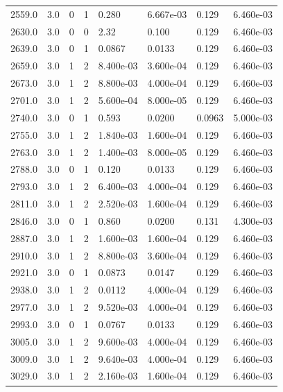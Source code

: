 \documentclass[preview]{standalone}
\begin{document}
{{{\begin{tabular}{L{1.2cm}C{1.2cm} C{0.3cm}C{0.5cm} C{1.4cm}C{1.4cm} C{1.4cm}C{1.4cm}}
  2559.0  &   3.0  & 0     &  1 &  0.280  & 6.667e-03  & 0.129 &  6.460e-03   \\ 
  2630.0  &   3.0  & 0     &  0 &  2.32  & 0.100  & 0.129 &  6.460e-03   \\ 
  2639.0  &   3.0  & 0     &  1 &  0.0867  & 0.0133  & 0.129 &  6.460e-03   \\ 
  2659.0  &   3.0  & 1     &  2 &  8.400e-03  & 3.600e-04  & 0.129 &  6.460e-03   \\ 
  2673.0  &   3.0  & 1     &  2 &  8.800e-03  & 4.000e-04  & 0.129 &  6.460e-03   \\ 
  2701.0  &   3.0  & 1     &  2 &  5.600e-04  & 8.000e-05  & 0.129 &  6.460e-03   \\ 
  2740.0  &   3.0  & 0     &  1 &  0.593  & 0.0200  & 0.0963 &  5.000e-03   \\ 
  2755.0  &   3.0  & 1     &  2 &  1.840e-03  & 1.600e-04  & 0.129 &  6.460e-03   \\ 
  2763.0  &   3.0  & 1     &  2 &  1.400e-03  & 8.000e-05  & 0.129 &  6.460e-03   \\ 
  2788.0  &   3.0  & 0     &  1 &  0.120  & 0.0133  & 0.129 &  6.460e-03   \\ 
  2793.0  &   3.0  & 1     &  2 &  6.400e-03  & 4.000e-04  & 0.129 &  6.460e-03   \\ 
  2811.0  &   3.0  & 1     &  2 &  2.520e-03  & 1.600e-04  & 0.129 &  6.460e-03   \\ 
  2846.0  &   3.0  & 0     &  1 &  0.860  & 0.0200  & 0.131 &  4.300e-03   \\ 
  2887.0  &   3.0  & 1     &  2 &  1.600e-03  & 1.600e-04  & 0.129 &  6.460e-03   \\ 
  2910.0  &   3.0  & 1     &  2 &  8.800e-03  & 3.600e-04  & 0.129 &  6.460e-03   \\ 
  2921.0  &   3.0  & 0     &  1 &  0.0873  & 0.0147  & 0.129 &  6.460e-03   \\ 
  2938.0  &   3.0  & 1     &  2 &  0.0112  & 4.000e-04  & 0.129 &  6.460e-03   \\ 
  2977.0  &   3.0  & 1     &  2 &  9.520e-03  & 4.000e-04  & 0.129 &  6.460e-03   \\ 
  2993.0  &   3.0  & 0     &  1 &  0.0767  & 0.0133  & 0.129 &  6.460e-03   \\ 
  3005.0  &   3.0  & 1     &  2 &  9.600e-03  & 4.000e-04  & 0.129 &  6.460e-03   \\ 
  3009.0  &   3.0  & 1     &  2 &  9.640e-03  & 4.000e-04  & 0.129 &  6.460e-03   \\ 
  3029.0  &   3.0  & 1     &  2 &  2.160e-03  & 1.600e-04  & 0.129 &  6.460e-03   \\ 

\end{tabular}}}}
\end{document}

